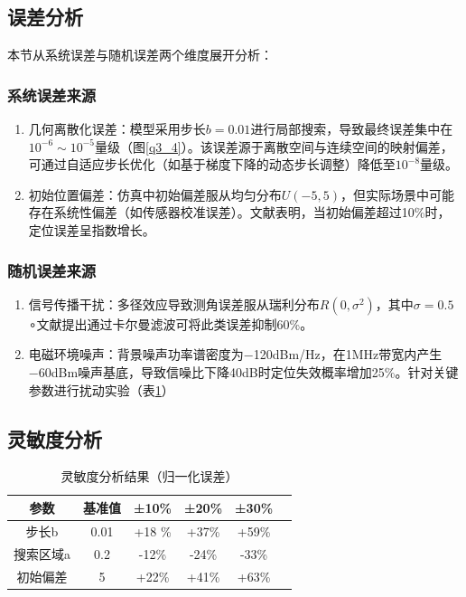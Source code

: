\documentclass[withoutpreface,bwprint]{cumcmthesis} %
\begin{document}
\subsection{误差分析}
本节从系统误差与随机误差两个维度展开分析：

\subsubsection{系统误差来源}


\begin{enumerate}
    \item ​几何离散化误差​​：模型采用步长$b=0.01$进行局部搜索，导致最终误差集中在$10^{-6} \sim 10^{-5}$量级（图\ref{q3_4}）。该误差源于离散空间与连续空间的映射偏差，可通过自适应步长优化（如基于梯度下降的动态步长调整）降低至$10^{−8}$量级。
    \item ​​初始位置偏差​​：仿真中初始偏差服从均匀分布$U(−5,5)$，但实际场景中可能存在系统性偏差（如传感器校准误差）。文献表明，当初始偏差超过10\%时，定位误差呈指数增长。
\end{enumerate}
\subsubsection{随机误差来源}

\begin{enumerate}
    \item ​​信号传播干扰​​：多径效应导致测角误差服从瑞利分布$R(0,\sigma^2)$，其中$\sigma=0.5$ ∘文献提出通过卡尔曼滤波可将此类误差抑制60\%。
    \item ​​电磁环境噪声​：背景噪声功率谱密度为−120dBm/Hz，在1MHz带宽内产生−60dBm噪声基底，导致信噪比下降40dB时定位失效概率增加25\%。针对关键参数进行扰动实验（表\ref{tab:sensitivity}）
\end{enumerate}

\subsection{灵敏度分析}


\begin{table}[H]
    \centering
    \caption{灵敏度分析结果（归一化误差）}
    \label{tab:sensitivity}
    \begin{tabular}{c c c c c c}
    \toprule
    参数 & 基准值 & ±10\% & ±20\% & ±30\% \\
    \midrule
    步长b & 0.01 & +18 \% & +37\% & +59\% \\
    搜索区域a & 0.2 & -12\% & -24\% & -33\% \\
    初始偏差 & 5 & +22\% & +41\% & +63\% \\
    \bottomrule
    \end{tabular}
\end{table}
\end{document}
